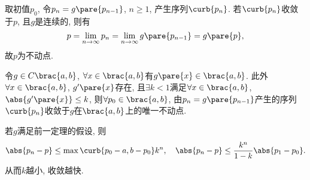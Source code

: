 \documentclass[hidelinks]{ctexart}
\begin{document}
取初值$p_0$, 令$p_n = g\pare{p_{n-1}}$, $n\ge 1$, 产生序列$\curb{p_n}$. 若$\curb{p_n}$收敛于$p$, 且$g$是连续的, 则有
\[ p = \lim_{n\rightarrow \infty}p_n = \lim_{n\rightarrow \infty}g\pare{p_{n-1}} = g\pare{p}, \]
故$p$为不动点.
\begin{theorem}
    令$g\in C\brac{a,b}$, $\forall x\in\brac{a,b}$有$g\pare{x} \in \brac{a,b}$. 此外$\forall x\in \brac{a,b}$, $g'\pare{x}$存在, 且$\exists k<1$满足$\forall x\in\brac{a,b}$, $\abs{g'\pare{x}} \le k$, 则$\forall p_0 \in \brac{a,b}$, 由$p_n = g\pare{p_{n-1}}$产生的序列$\curb{p_n}$收敛于$g$在$\brac{a,b}$上的唯一不动点.
\end{theorem}
\begin{corollary}
    若$g$满足前一定理的假设, 则
    \[ \abs{p_n - p} \le \max\curb{p_0 - a,b-p_0}k^n,\quad \abs{p_n - p} \le \frac{k^n}{1-k}\abs{p_1 - p_0}. \]
    从而$k$越小, 收敛越快.
\end{corollary}
\end{document}
